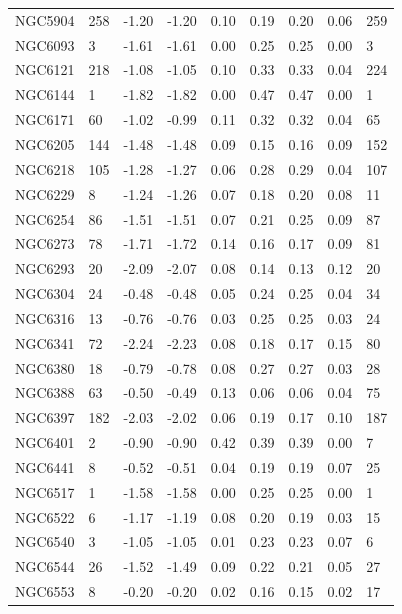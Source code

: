 \documentclass[a4paper,12pt]{article}
\begin{document}
\begin{small}
\begin{center}
\begin{longtable}{|p{2cm}|p{1cm}|p{1.5cm}|p{1.5cm}|p{1.5cm}|p{1.5cm}|p{1.5cm}|p{1.5cm}|p{2cm}|}
      NGC5904 & 258 & -1.20 & -1.20 & 0.10 & 0.19 & 0.20 & 0.06 &259\\
      NGC6093 & 3 & -1.61 & -1.61 & 0.00 & 0.25 & 0.25 & 0.00 &3\\
      NGC6121 & 218 & -1.08 & -1.05 & 0.10 & 0.33 & 0.33 & 0.04 &224\\
      NGC6144 & 1 & -1.82 & -1.82 & 0.00 & 0.47 & 0.47 & 0.00 &1\\
      NGC6171 & 60 & -1.02 & -0.99 & 0.11 & 0.32 & 0.32 & 0.04 &65\\
      NGC6205 & 144 & -1.48 & -1.48 & 0.09 & 0.15 & 0.16 & 0.09 &152\\
      NGC6218 & 105 & -1.28 & -1.27 & 0.06 & 0.28 & 0.29 & 0.04 &107\\
      NGC6229 & 8 & -1.24 & -1.26 & 0.07 & 0.18 & 0.20 & 0.08 &11\\
      NGC6254 & 86 & -1.51 & -1.51 & 0.07 & 0.21 & 0.25 & 0.09 &87\\
      NGC6273 & 78 & -1.71 & -1.72 & 0.14 & 0.16 & 0.17 & 0.09 &81\\
      NGC6293 & 20 & -2.09 & -2.07 & 0.08 & 0.14 & 0.13 & 0.12 &20\\
      NGC6304 & 24 & -0.48 & -0.48 & 0.05 & 0.24 & 0.25 & 0.04 &34\\
      NGC6316 & 13 & -0.76 & -0.76 & 0.03 & 0.25 & 0.25 & 0.03 &24\\
      NGC6341 & 72 & -2.24 & -2.23 & 0.08 & 0.18 & 0.17 & 0.15 &80\\
      NGC6380 & 18 & -0.79 & -0.78 & 0.08 & 0.27 & 0.27 & 0.03 &28\\
      NGC6388 & 63 & -0.50 & -0.49 & 0.13 & 0.06 & 0.06 & 0.04 &75\\
      NGC6397 & 182 & -2.03 & -2.02 & 0.06 & 0.19 & 0.17 & 0.10 &187\\
      NGC6401 & 2 & -0.90 & -0.90 & 0.42 & 0.39 & 0.39 & 0.00 &7\\
      NGC6441 & 8 & -0.52 & -0.51 & 0.04 & 0.19 & 0.19 & 0.07 &25\\
      NGC6517 & 1 & -1.58 & -1.58 & 0.00 & 0.25 & 0.25 & 0.00 &1\\
      NGC6522 & 6 & -1.17 & -1.19 & 0.08 & 0.20 & 0.19 & 0.03 &15\\
      NGC6540 & 3 & -1.05 & -1.05 & 0.01 & 0.23 & 0.23 & 0.07 &6\\
      NGC6544 & 26 & -1.52 & -1.49 & 0.09 & 0.22 & 0.21 & 0.05 &27\\
      NGC6553 & 8 & -0.20 & -0.20 & 0.02 & 0.16 & 0.15 & 0.02 &17\\

\end{longtable}
\end{center}
\end{small}
\end{document}
